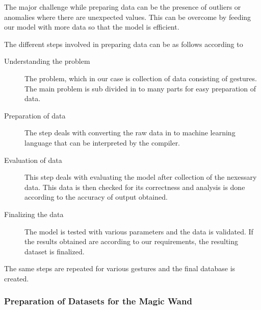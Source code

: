 The major challenge while preparing data can be the presence of outliers or anomalies where there are unexpected values. This can be overcome by feeding our model with more data so that the model is efficient. \cite{Warden:2020}

The different steps involved in preparing data can be as follows according to \cite{Warden:2020}

\begin{description}
    \item[Understanding the problem] The problem, which in our case is collection of data consisting of gestures. The main problem is sub divided in to many parts for easy preparation of data.
    \item[Preparation of data] The step deals with converting the raw data in to machine learning language that can be interpreted by the compiler. 
    \item[Evaluation of data] This step deals with evaluating the model after collection of the nexessary data. This data is then checked for its correctness and analysis is done according to the accuracy of output obtained. 
    \item[Finalizing the data] The model is tested with various parameters and the data is validated. If the results obtained are according to our requirements, the resulting dataset is finalized.
\end{description}

The same steps are repeated for various gestures and the final database is created.

\subsubsection{Preparation of Datasets for the Magic Wand}

